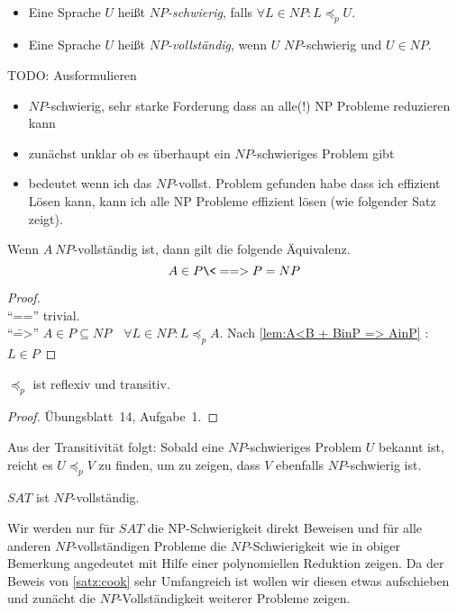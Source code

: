 
\begin{Def}[name={[$NP$-schwierig und $NP$-vollständig]}]\
	\begin{itemize}
	\item Eine Sprache $U$ heißt \emph{$NP$-schwierig}, falls $\forall L\in NP : L\preceq_p U$.
	\item Eine Sprache $U$ heißt \emph{$NP$-vollständig}, wenn $U$ $NP$-schwierig und $U\in NP$. \qedhere
	\end{itemize}
\end{Def}

{\color{red}
TODO: Ausformulieren
\begin{itemize}
 \item $NP$-schwierig, sehr starke Forderung dass an alle(!) NP Probleme reduzieren kann
 \item zunächst unklar ob es überhaupt ein $NP$-schwieriges Problem gibt
 \item bedeutet wenn ich das $NP$-vollst. Problem gefunden habe dass ich effizient Lösen kann, kann ich alle NP Probleme effizient lösen (wie folgender Satz zeigt).
\end{itemize}
}
\begin{Satz}
	Wenn $A\ NP$-vollständig ist, dann gilt die folgende Äquivalenz.
	\[ A\in P \<==> P=NP \]
\end{Satz}
\begin{proof}\ \\
	"`\<=="' trivial.\\
	"`\==>"' $A\in P\subseteq NP\quad \forall L\in NP: L\preceq_p A$. Nach \autoref{lem:A<B + BinP => AinP} : $L\in P$
\end{proof}

\begin{lemma}[name={[$\preceq_p$ ist reflexiv und transitiv]}]
	$\preceq_p$ ist reflexiv und transitiv.
\end{lemma}
\begin{proof}
Übungsblatt~14, Aufgabe~1.
\end{proof}

\begin{Bem}
    Aus der Transitivität folgt:
	Sobald eine $NP$-schwieriges Problem $U$ bekannt ist, reicht es $U\preceq_p V$ zu finden, um zu zeigen, dass $V$ ebenfalls $NP$-schwierig ist.
\end{Bem}

\begin{Satz}[Cook]\label{satz:cook}
	$SAT$ ist $NP$-vollständig.
\end{Satz}
Wir werden nur für $SAT$ die NP-Schwierigkeit direkt Beweisen und für alle anderen $NP$-vollständigen Probleme die $NP$-Schwierigkeit wie in obiger Bemerkung angedeutet mit Hilfe einer polynomiellen Reduktion zeigen.
Da der Beweis von \autoref{satz:cook} sehr Umfangreich ist wollen wir diesen etwas aufschieben und zunächt die $NP$-Vollständigkeit weiterer Probleme zeigen.


